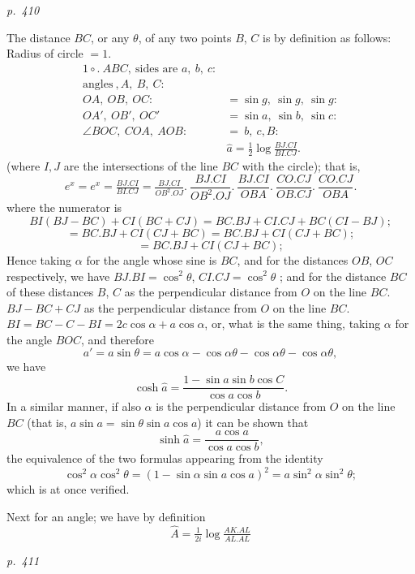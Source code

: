 \documentclass[11pt,a4paper]{book}
\begin{document}
\clearpage

\bigskip
\textit{p.~410}
\smallskip

\noindent
The distance $BC$, or any $\theta$, of any two points $B$, $C$ is by definition as follows:
Radius of circle $= 1$.
\begin{align*}
\mathrm{1\circ}.\ ABC,\ \text{sides are } a,\ b,\ c: \\
\text{angles}\ ,A,\ B,\ C: \\
OA,\ OB,\ OC: &= \sin g,\ \sin g,\ \sin g: \\
OA',\ OB',\ OC' &= \sin a,\ \sin b,\ \sin c: \\
\angle BOC,\ COA,\ AOB: &=\ b,\ c, B: \\
&\hat{a} = \tfrac{1}{2} \log \tfrac{BJ.CI}{BI.CJ}.
\end{align*}
(where $I, J$ are the intersections of the line $BC$ with the circle); that is,
\[
e^x = e^x = \tfrac{BJ.CI}{BI.CJ} = \tfrac{BJ.CI}{OB^2.OJ}.\ \frac{BJ.CI}{OB^2.OJ}.\ \frac{BJ.CI}{OBA}.\ \frac{CO.CJ}{OB.CJ}.\ \frac{CO.CJ}{OBA}.
\]
where the numerator is
\[
BI(BJ - BC) + CI(BC + CJ) = BC.BJ + CI.CJ + BC(CI - BJ);
\]
\[
= BC.BJ + CI(CJ + BC) = BC.BJ + CI(CJ + BC);
\]
\[
= BC.BJ + CI(CJ + BC);
\]
Hence taking $\alpha$ for the angle whose sine is $BC$, and for the distances $OB$, $OC$ respectively,
we have $BJ.BI = \cos^2 \theta$, $CI.CJ = \cos^2 \theta$ ; and for the distance $BC$ of these distances $B$, $C$ as the perpendicular distance from $O$ on the line $BC$.
$BJ - BC + CJ$ as the perpendicular distance from $O$ on the line $BC$.
$BI = BC - C - BI = 2c \cos \alpha + a \cos \alpha$,
or, what is the same thing, taking $\alpha$ for the angle $BOC$, and therefore
\[
a' = a \sin \theta = a \cos \alpha - \cos \alpha \theta - \cos \alpha \theta - \cos \alpha \theta,
\]
we have
\[
\cosh \hat{a} = \frac{1 - \sin a \sin b \cos C}{\cos a \cos b}.
\]
In a similar manner, if also $\alpha$ is the perpendicular distance from $O$ on the line $BC$
(that is, $a \sin a = \sin \theta \sin a \cos a$) it can be shown that
\[
\sinh \hat{a} = \frac{a \cos a}{\cos a \cos b},
\]
the equivalence of the two formulas appearing from the identity
\[
\cos^2\alpha \cos^2 \theta = (1 - \sin \alpha \sin a \cos a)^2 = a \sin^2 \alpha \sin^2 \theta;
\]
which is at once verified.

Next for an angle; we have by definition
\[
\hat{A} = \tfrac{1}{2 i} \log \tfrac{AK. AL}{AL.AL}
\]

\clearpage

\bigskip
\textit{p.~411}
\smallskip
\end{document}
